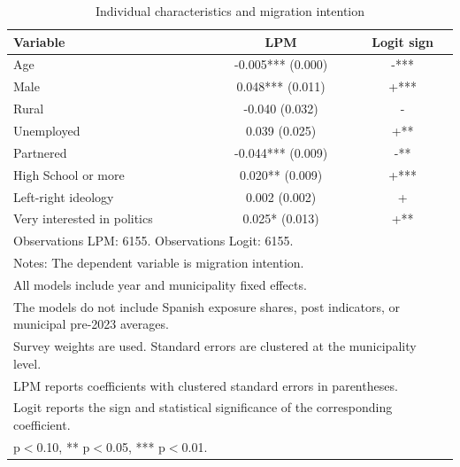 \begin{table}[!htbp]
\centering
\caption{Individual characteristics and migration intention}
\label{tab:individual_characteristics}
\small
\begin{tabular}{lcc}
\hline
Variable & LPM & Logit sign \\
\hline
Age & -0.005*** (0.000) & -*** \\
Male & 0.048*** (0.011) & +*** \\
Rural & -0.040 (0.032) & - \\
Unemployed & 0.039 (0.025) & +** \\
Partnered & -0.044*** (0.009) & -** \\
High School or more & 0.020** (0.009) & +*** \\
Left-right ideology & 0.002 (0.002) & + \\
Very interested in politics & 0.025* (0.013) & +** \\
\hline
\multicolumn{3}{l}{\footnotesize Observations LPM: 6155. Observations Logit: 6155.} \\
\multicolumn{3}{l}{\footnotesize Notes: The dependent variable is migration intention.} \\
\multicolumn{3}{l}{\footnotesize All models include year and municipality fixed effects.} \\
\multicolumn{3}{l}{\footnotesize The models do not include Spanish exposure shares, post indicators, or municipal pre-2023 averages.} \\
\multicolumn{3}{l}{\footnotesize Survey weights are used. Standard errors are clustered at the municipality level.} \\
\multicolumn{3}{l}{\footnotesize LPM reports coefficients with clustered standard errors in parentheses.} \\
\multicolumn{3}{l}{\footnotesize Logit reports the sign and statistical significance of the corresponding coefficient.} \\
\multicolumn{3}{l}{\footnotesize * p$<$0.10, ** p$<$0.05, *** p$<$0.01.} \\
\end{tabular}
\end{table}

